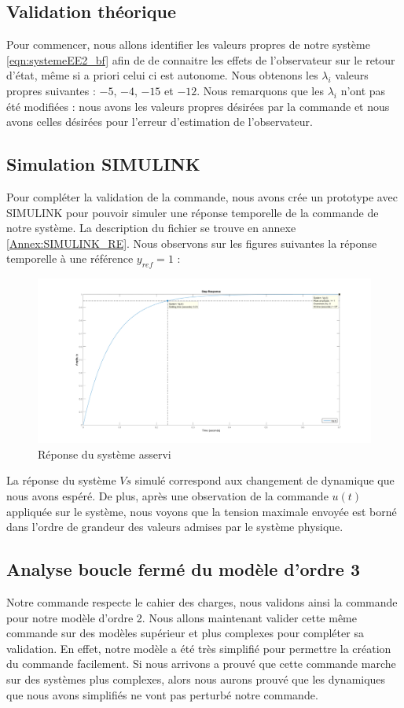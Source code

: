 \subsection{Validation théorique}
Pour commencer, nous allons identifier les valeurs propres de notre système \ref{eqn:systemeEE2_bf} afin de de connaitre les effets de l'observateur sur le retour d'état, même si a priori celui ci est autonome. Nous obtenons les $\lambda_i$ valeurs propres suivantes : $-5$, $-4$, $-15$ et $-12$. Nous remarquons que les $\lambda_i$ n'ont pas été modifiées : nous avons les valeurs propres désirées par la commande et nous avons celles désirées pour l'erreur d'estimation de l'observateur. 

\subsection{Simulation SIMULINK}
Pour compléter la validation de la commande, nous avons crée un prototype avec SIMULINK pour pouvoir simuler une réponse temporelle de la commande de notre système. La description du fichier se trouve en annexe \ref{Annex:SIMULINK_RE}. Nous observons sur les figures suivantes la réponse temporelle à une référence $y_{ref} = 1$ : 
\begin{figure}[!ht]
\begin{center}
\includegraphics[width = \textwidth]{./III/figure/stepEE2bf.png}
\caption{Réponse du système asservi}
\end{center}
\end{figure}
La réponse du système $Vs$ simulé correspond aux changement de dynamique que nous avons espéré. De plus, après une observation de la commande $u(t)$ appliquée sur le système, nous voyons que la tension maximale envoyée est borné dans l'ordre de grandeur des valeurs admises par le système physique. 


\subsection{Analyse boucle fermé du modèle d'ordre 3}
Notre commande respecte le cahier des charges, nous validons ainsi la commande pour notre modèle d'ordre 2. Nous allons maintenant valider cette même commande sur des modèles supérieur et plus complexes pour compléter sa validation. En effet, notre modèle a été très simplifié pour permettre la création du commande facilement. Si nous arrivons a prouvé que cette commande marche sur des systèmes plus complexes, alors nous aurons prouvé que les dynamiques que nous avons simplifiés ne vont pas perturbé notre commande.

